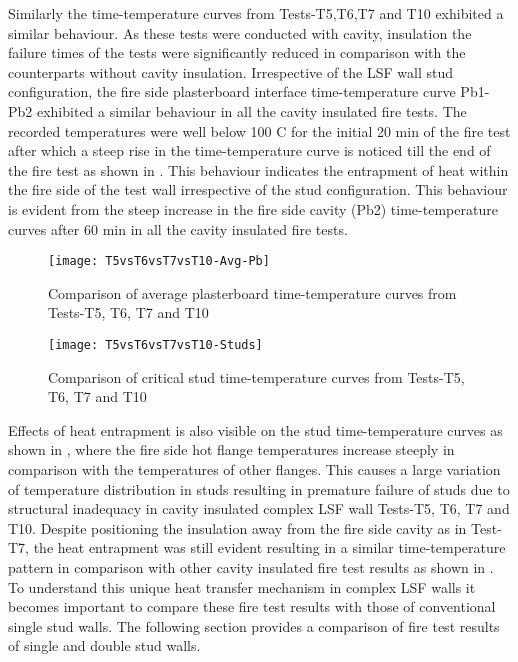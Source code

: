 Similarly the time-temperature curves from Tests-T5,T6,T7 and T10 exhibited a similar behaviour. As these tests were conducted with cavity, insulation the failure times of the tests were significantly reduced in comparison with the counterparts without cavity insulation. Irrespective of the LSF wall stud configuration, the fire side plasterboard interface time-temperature curve Pb1-Pb2 exhibited a similar behaviour in all the cavity insulated fire tests. The recorded temperatures were well below 100 \degree C for the initial 20 min of the fire test after which a steep rise in the time-temperature curve is noticed till the end of the fire test as shown in . This behaviour indicates the entrapment of heat within the fire side of the test wall irrespective of the stud configuration. This behaviour is evident from the steep increase in the fire side cavity (Pb2) time-temperature curves after 60 min in all the cavity insulated fire tests.  
\begin{figure}[!htbp]
	\centering
		\texttt{[image: T5vsT6vsT7vsT10-Avg-Pb]}  
	\caption{Comparison of average plasterboard time-temperature curves from Tests-T5, T6, T7 and T10}
	\label{fig:T5vsT6vsT7vsT10-Avg-Pb}
\end{figure}
\begin{figure}[!htbp]
	\centering
		\texttt{[image: T5vsT6vsT7vsT10-Studs]}  
	\caption{Comparison of critical stud time-temperature curves from Tests-T5, T6, T7 and T10}
	\label{fig:T5vsT6vsT7vsT10-Studs}
\end{figure} 

Effects of heat entrapment is also visible on the stud time-temperature curves as shown in , where the fire side hot flange temperatures increase steeply in comparison with the temperatures of other flanges. This causes a large variation of temperature distribution in studs resulting in premature failure of studs due to structural inadequacy in cavity insulated complex LSF wall Tests-T5, T6, T7 and T10. Despite positioning the insulation away from the fire side cavity as in Test-T7, the heat entrapment was still evident resulting in a similar time-temperature pattern in comparison with other cavity insulated fire test results as shown in . To understand this unique heat transfer mechanism in complex LSF walls it becomes important to compare these fire test results with those of conventional single stud walls. The following section provides a comparison of fire test results of single and double stud walls.

